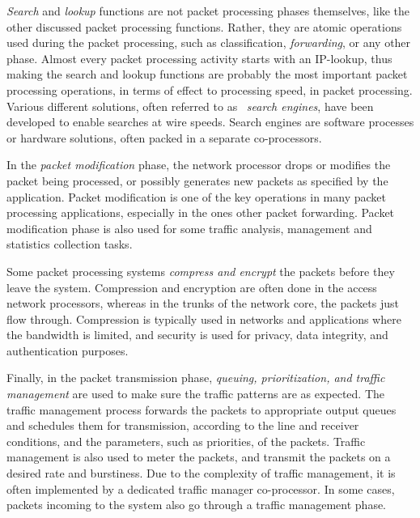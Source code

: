 \emph{Search} and \emph{lookup} functions are not packet processing phases themselves, like the other discussed packet processing functions. Rather, they are atomic operations used during the packet processing, such as classification, \emph{forwarding}, or any other phase. Almost every packet processing activity starts with an IP-lookup, thus making the search and lookup functions are probably the most important packet processing operations, in terms of effect to processing speed, in packet processing. Various different solutions, often referred to as ~\emph{search engines}, have been developed to enable searches at wire speeds. Search engines are software processes or hardware solutions, often packed in a separate co-processors.~\cite{Giladi:2008:Network}


In the \emph{packet modification} phase, the network processor drops or modifies the packet being processed, or possibly generates new packets as specified by the application. Packet modification is one of the key operations in many packet processing applications, especially in the ones other packet forwarding. Packet modification phase is also used for some traffic analysis, management and statistics collection tasks.~\cite{Giladi:2008:Network}

Some packet processing systems \emph{compress and encrypt} the packets before they leave the system. Compression and encryption are often done in the access network processors, whereas in the trunks of the network core, the packets just flow through. Compression is typically used in networks and applications where the bandwidth is limited, and security is used for privacy, data integrity, and authentication purposes.~\cite{Giladi:2008:Network}

Finally, in the packet transmission phase, \emph{queuing, prioritization, and traffic management} are used to make sure the traffic patterns are as expected. The traffic management process forwards the packets to appropriate output queues and schedules them for transmission, according to the line and receiver conditions, and the parameters, such as priorities, of the packets. Traffic management is also used to meter the packets, and transmit the packets on a desired rate and burstiness. Due to the complexity of traffic management, it is often implemented by a dedicated traffic manager co-processor. In some cases, packets incoming to the system also go through a traffic management phase.~\cite{Giladi:2008:Network}

